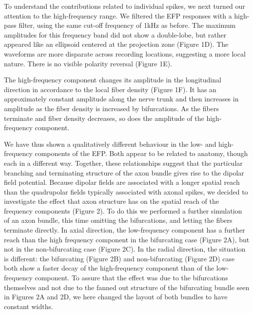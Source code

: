 \documentclass[]{article}
\begin{document}
To understand the contributions related to individual spikes, we next
turned our attention to the high-frequency range. We filtered the EFP
responses with a high-pass filter, using the same cut-off frequency of
1kHz as before. The maximum amplitudes for this frequency band did not
show a double-lobe, but rather appeared like an ellipsoid centered at
the projection zone (Figure 1D). The waveforms are more disparate across
recording locations, suggesting a more local nature. There is no visible
polarity reversal (Figure 1E).

The high-frequency component changes its amplitude in the longitudinal
direction in accordance to the local fiber density (Figure 1F). It has
an approximately constant amplitude along the nerve trunk and then
increases in amplitude as the fiber density is increased by
bifurcations. As the fibers terminate and fiber density decreases, so
does the amplitude of the high-frequency component.

We have thus shown a qualitatively different behaviour in the low- and
high-frequency components of the EFP. Both appear to be related to
anatomy, though each in a different way. Together, these relationships
suggest that the particular branching and terminating structure of the
axon bundle gives rise to the dipolar field potential. Because dipolar
fields are associated with a longer spatial reach than the quadrupolar
fields typically associated with axonal spikes, we decided to
investigate the effect that axon structure has on the spatial reach of
the frequency components (Figure 2). To do this we performed a further
simulation of an axon bundle, this time omitting the bifurcations, and
letting the fibers terminate directly. In axial direction, the
low-frequency component has a further reach than the high frequency
component in the bifurcating case (Figure 2A), but not in the
non-bifurcating case (Figure 2C). In the radial direction, the situation
is different: the bifurcating (Figure 2B) and non-bifurcating (Figure
2D) case both show a faster decay of the high-frequency component than
of the low-frequency component. To assure that the effect was due to the
bifurcations themselves and not due to the fanned out structure of the
bifurcating bundle seen in Figures 2A and 2D, we here changed the layout
of both bundles to have constant widths.
\end{document}
